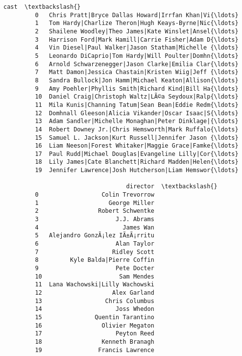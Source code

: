 \documentclass[11pt]{article}
\begin{document}
\begin{Verbatim}[commandchars=\\\{\}]
                                                          cast  \textbackslash{}
         0   Chris Pratt|Bryce Dallas Howard|Irrfan Khan|Vi{\ldots}   
         1   Tom Hardy|Charlize Theron|Hugh Keays-Byrne|Nic{\ldots}   
         2   Shailene Woodley|Theo James|Kate Winslet|Ansel{\ldots}   
         3   Harrison Ford|Mark Hamill|Carrie Fisher|Adam D{\ldots}   
         4   Vin Diesel|Paul Walker|Jason Statham|Michelle {\ldots}   
         5   Leonardo DiCaprio|Tom Hardy|Will Poulter|Domhn{\ldots}   
         6   Arnold Schwarzenegger|Jason Clarke|Emilia Clar{\ldots}   
         7   Matt Damon|Jessica Chastain|Kristen Wiig|Jeff {\ldots}   
         8   Sandra Bullock|Jon Hamm|Michael Keaton|Allison{\ldots}   
         9   Amy Poehler|Phyllis Smith|Richard Kind|Bill Ha{\ldots}   
         10  Daniel Craig|Christoph Waltz|LÃ©a Seydoux|Ralp{\ldots}   
         11  Mila Kunis|Channing Tatum|Sean Bean|Eddie Redm{\ldots}   
         12  Domhnall Gleeson|Alicia Vikander|Oscar Isaac|S{\ldots}   
         13  Adam Sandler|Michelle Monaghan|Peter Dinklage|{\ldots}   
         14  Robert Downey Jr.|Chris Hemsworth|Mark Ruffalo{\ldots}   
         15  Samuel L. Jackson|Kurt Russell|Jennifer Jason {\ldots}   
         16  Liam Neeson|Forest Whitaker|Maggie Grace|Famke{\ldots}   
         17  Paul Rudd|Michael Douglas|Evangeline Lilly|Cor{\ldots}   
         18  Lily James|Cate Blanchett|Richard Madden|Helen{\ldots}   
         19  Jennifer Lawrence|Josh Hutcherson|Liam Hemswor{\ldots}   
         
                                   director  \textbackslash{}
         0                  Colin Trevorrow   
         1                    George Miller   
         2                 Robert Schwentke   
         3                      J.J. Abrams   
         4                        James Wan   
         5   Alejandro GonzÃ¡lez IÃ±Ã¡rritu   
         6                      Alan Taylor   
         7                     Ridley Scott   
         8         Kyle Balda|Pierre Coffin   
         9                      Pete Docter   
         10                      Sam Mendes   
         11  Lana Wachowski|Lilly Wachowski   
         12                    Alex Garland   
         13                  Chris Columbus   
         14                     Joss Whedon   
         15               Quentin Tarantino   
         16                 Olivier Megaton   
         17                     Peyton Reed   
         18                 Kenneth Branagh   
         19                Francis Lawrence   
         

\end{Verbatim}
\end{document}

